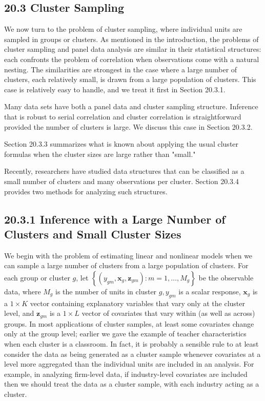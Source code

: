 \documentclass[10pt]{article}
\begin{document}
\subsection*{20.3 Cluster Sampling}
We now turn to the problem of cluster sampling, where individual units are sampled in groups or clusters. As mentioned in the introduction, the problems of cluster sampling and panel data analysis are similar in their statistical structures: each confronts the problem of correlation when observations come with a natural nesting. The similarities are strongest in the case where a large number of clusters, each relatively small, is drawn from a large population of clusters. This case is relatively easy to handle, and we treat it first in Section 20.3.1.

Many data sets have both a panel data and cluster sampling structure. Inference that is robust to serial correlation and cluster correlation is straightforward provided the number of clusters is large. We discuss this case in Section 20.3.2.

Section 20.3.3 summarizes what is known about applying the usual cluster formulas when the cluster sizes are large rather than "small."

Recently, researchers have studied data structures that can be classified as a small number of clusters and many observations per cluster. Section 20.3.4 provides two methods for analyzing such structures.

\subsection*{20.3.1 Inference with a Large Number of Clusters and Small Cluster Sizes}
We begin with the problem of estimating linear and nonlinear models when we can sample a large number of clusters from a large population of clusters. For each group or cluster $g$, let $\left\{\left(y_{g m}, \mathbf{x}_{g}, \mathbf{z}_{g m}\right): m=1, \ldots, M_{g}\right\}$ be the observable data, where $M_{g}$ is the number of units in cluster $g, y_{g m}$ is a scalar response, $\mathbf{x}_{g}$ is a $1 \times K$ vector containing explanatory variables that vary only at the cluster level, and $\mathbf{z}_{g m}$ is a $1 \times L$ vector of covariates that vary within (as well as across) groups. In most applications of cluster samples, at least some covariates change only at the group level; earlier we gave the example of teacher characteristics when each cluster is a classroom. In fact, it is probably a sensible rule to at least consider the data as being generated as a cluster sample whenever covariates at a level more aggregated than the individual units are included in an analysis. For example, in analyzing firm-level data, if industry-level covariates are included then we should treat the data as a cluster sample, with each industry acting as a cluster.
\end{document}
